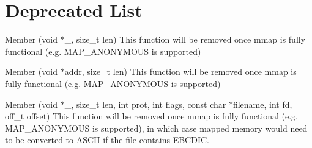 \chapter{Deprecated List}
\hypertarget{deprecated}{}\label{deprecated}

\begin{DoxyRefList}
\item[Member \doxylink{zos_8cc_adecc3f8804ee3922dfe303e07abd99d6}{anon\+\_\+mmap} (void \texorpdfstring{$\ast$}{*}\+\_\+, size\+\_\+t len)]\label{deprecated__deprecated000001}%
%
This function will be removed once mmap is fully functional (e.\+g. MAP\+\_\+\+ANONYMOUS is supported)  
\item[Member \doxylink{zos_8cc_aa00ab042a596dd63795d3791d34b8d29}{anon\+\_\+munmap} (void \texorpdfstring{$\ast$}{*}addr, size\+\_\+t len)]\label{deprecated__deprecated000003}%
%
This function will be removed once mmap is fully functional (e.\+g. MAP\+\_\+\+ANONYMOUS is supported)  
\item[Member \doxylink{zos_8cc_a45796cfeb1ecbd8ba79f191fa70cc2e6}{roanon\+\_\+mmap} (void \texorpdfstring{$\ast$}{*}\+\_\+, size\+\_\+t len, int prot, int flags, const char \texorpdfstring{$\ast$}{*}filename, int fd, off\+\_\+t offset)]\label{deprecated__deprecated000002}%
%
This function will be removed once mmap is fully functional (e.\+g. MAP\+\_\+\+ANONYMOUS is supported), in which case mapped memory would need to be converted to ASCII if the file contains EBCDIC. 
\end{DoxyRefList}